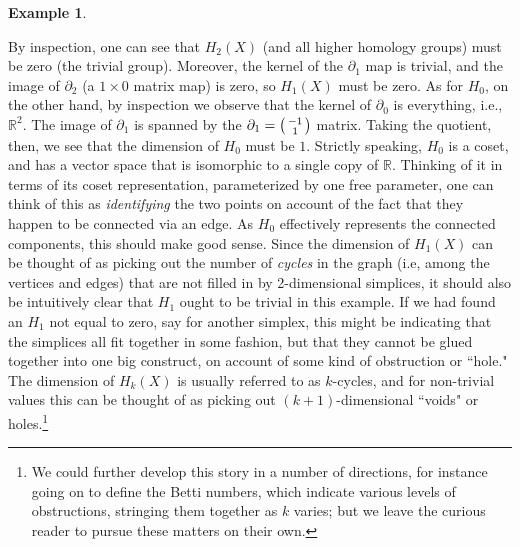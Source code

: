 \documentclass[11pt]{book}
\theoremstyle{definition}
\newtheorem{example}{Example}[section]
\theoremstyle{definition}
\theoremstyle{definition}
\theoremstyle{theorem}
\theoremstyle{definition}
\begin{document}
\begin{example}
	\begin{center} 
	 \end{center} \par \noindent 
	By inspection, one can see that $H_2(X)$ (and all higher homology groups) must be zero (the trivial group). Moreover, the kernel of the $\partial_1$ map is trivial, and the image of $\partial_2$ (a $1\times 0$ matrix map) is zero, so $H_1(X)$ must be zero. As for $H_0$, on the other hand, by inspection we observe that the kernel of $\partial_0$ is everything, i.e., $\mathbb{R}^2$. The image of $\partial_1$ is spanned by the $\partial_1 = \begin{psmallmatrix} -1 \\ 1
	\end{psmallmatrix}$ matrix. Taking the quotient, then, we see that the dimension of $H_0$ must be $1$. Strictly speaking, $H_0$ is a coset, and has a vector space that is isomorphic to a single copy of $\mathbb{R}$. Thinking of it in terms of its coset representation, parameterized by one free parameter, one can think of this as \textit{identifying} the two points on account of the fact that they happen to be connected via an edge. As $H_0$ effectively represents the connected components, this should make good sense. Since the dimension of $H_1 (X)$ can be thought of as picking out the number of \textit{cycles} in the graph (i.e, among the vertices and edges) that are not filled in by 2-dimensional simplices, it should also be intuitively clear that $H_1$ ought to be trivial in this example. If we had found an $H_1$ not equal to zero, say for another simplex, this might be indicating that the simplices all fit together in some fashion, but that they cannot be glued together into one big construct, on account of some kind of obstruction or ``hole." The dimension of $H_k(X)$ is usually referred to as $k$-cycles, and for non-trivial values this can be thought of as picking out $(k+1)$-dimensional ``voids" or holes.\footnote{We could further develop this story in a number of directions, for instance going on to define the Betti numbers, which indicate various levels of obstructions, stringing them together as $k$ varies; but we leave the curious reader to pursue these matters on their own.} \par 

\end{example}
\end{document}
